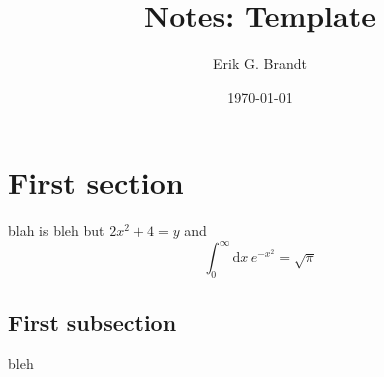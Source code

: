 \documentclass[aip,jcp,reprint,12pt,onecolumn,notitlepage,tightenlines,amsfonts,amsmath,amssymb]{revtex4-1}
\begin{document}
\author{Erik G. Brandt}


\date{\today}

\title{Notes: Template}

\maketitle

\section{First section}

blah is bleh but $2x^2 + 4 = y$ and
\begin{equation} \label{eq:1} 
  \int_{0}^{\infty} \mathrm{d}x \,
  e^{-x^2} = \sqrt{\pi}
\end{equation}

\subsection{First subsection}

bleh
\end{document}
